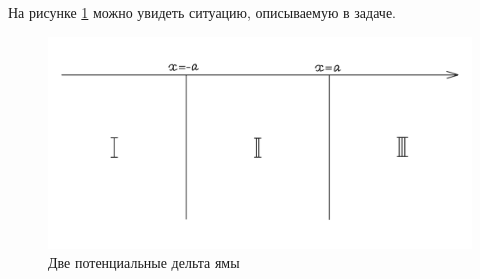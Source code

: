 На рисунке \ref{fig 4.3} можно увидеть ситуацию, описываемую в задаче.
\begin{figure}[!ht]
\centering
\includegraphics[scale=0.27]{class_4/images/two delta hole.png}
\caption{Две потенциальные дельта ямы}
\label{fig 4.3}
\end{figure}

